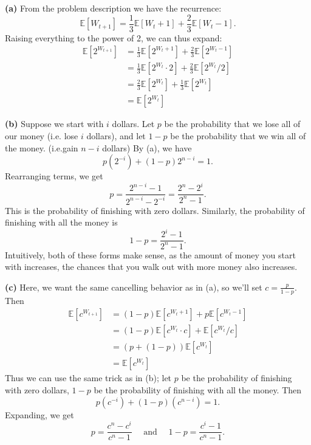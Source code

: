 \documentclass[11pt,letterpaper]{article}
\begin{document}
\begin{solution}
    \textbf{(a)} From the problem description we have the recurrence:
    \[
        \mathbb{E}[W_{t+1}]=\frac13\mathbb{E}[W_t+1]+\frac23\mathbb{E}[W_t-1].
    \] 
    Raising everything to the power of 2, we can thus expand:
    \[\begin{aligned}
        \mathbb{E}[2^{W_{t+1}}]&=\frac13\mathbb{E}[2^{W_t+1}]+\frac23\mathbb{E}[2^{W_t-1}]\\
            &=\frac{1}{3}\mathbb{E}[2^{W_t}\cdot 2] + \frac23\mathbb{E}[2^{W_t}/2]\\
            &=\frac23\mathbb{E}[2^{W_t}]+\frac13\mathbb{E}[2^{W_t}]\\
            &= \mathbb{E}[2^{W_t}]
    \end{aligned}\]

    \textbf{(b)} Suppose we start with $i$ dollars. Let $p$ be the probability that we lose all of our money (i.e. lose $i$ dollars), and let $1-p$ be the probability that we win all of the money. (i.e.gain $n-i$ dollars) By (a), we have
    \[
        p(2^{-i})+(1-p)2^{n-i}=1.
    \] 
    Rearranging terms, we get
    \[
        p = \frac{2^{n-i}-1}{2^{n-i}-2^{-i}} = \frac{2^n-2^i}{2^n-1}.
    \] 
    This is the probability of finishing with zero dollars. Similarly, the probability of finishing with all the money is
    \[
        1-p = \frac{2^i-1}{2^n-1}.
    \] 
    Intuitively, both of these forms make sense, as the amount of money you start with increases, the chances that you walk out with more money also increases.

    \textbf{(c)} Here, we want the same cancelling behavior as in (a), so we'll set $c=\frac{p}{1-p}$. Then
    \[\begin{aligned}
        \mathbb{E}[c^{W_{t+1}}]&=(1-p) \mathbb{E}[c^{W_t+1}]+p \mathbb{E}[c^{W_t-1}]\\
                               &=(1-p) \mathbb{E}[c^{W_t}\cdot c]+\mathbb{E}[c^{W_t}/c]\\
                               &=(p + (1-p))\mathbb{E}[c^{W_t}]\\
                               &= \mathbb{E}[c^{W_t}]
    \end{aligned}\]
    Thus we can use the same trick as in (b); let $p$ be the probability of finishing with zero dollars, $1-p$ be the probability of finishing with all the money. Then
    \[
        p(c^{-i})+(1-p)(c^{n-i})=1.
    \] 
    Expanding, we get
    \[
        p = \frac{c^n-c^i}{c^n-1}\quad \textrm{ and }\quad 1-p =\frac{c^i-1}{c^n-1}.
    \] 
\end{solution}
\end{document}
